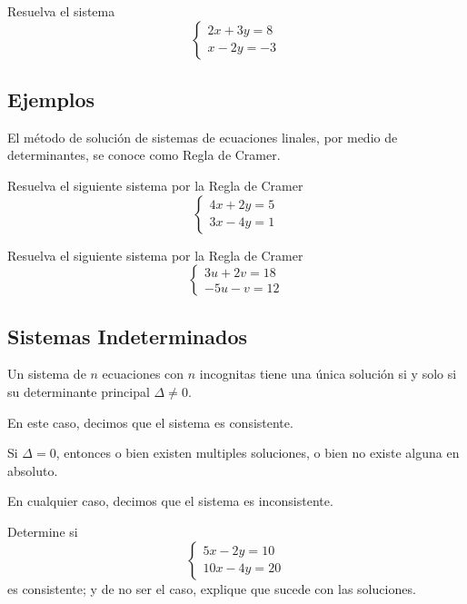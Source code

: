 	\begin{problema}
		Resuelva el sistema
		$$\begin{cases}
			2x+3y=8\\
			x-2y=-3
		\end{cases}
		$$
	\end{problema}
	

\subsection{Ejemplos}


	El m\'etodo de soluci\'on de sistemas de ecuaciones linales, por medio de determinantes, se conoce como Regla de Cramer.



	\begin{problema} Resuelva el siguiente sistema por la Regla de Cramer
		\label{spi:28.4a}
		$$
		\begin{cases}
			4x+2y=5\\
			3x-4y=1
		\end{cases}
		$$
	\end{problema}
	



	\begin{problema} Resuelva el siguiente sistema por la Regla de Cramer
		\label{spi:28.4b}
		$$
		\begin{cases}
			3u+2v=18\\
			-5u-v=12
		\end{cases}
		$$
	\end{problema}
	


\subsection{Sistemas Indeterminados}


	Un sistema de $ n $ ecuaciones con $ n $ incognitas tiene una única solución si y solo si su determinante principal $ \Delta \neq 0. $  
	
	En este caso, decimos que el sistema es consistente.



	Si $ \Delta =0 $, entonces o bien existen multiples soluciones, o bien no existe alguna en absoluto.
	
	En cualquier caso, decimos que el sistema es inconsistente.



	Determine si 
	$$\begin{cases}
		5x-2y=10\\
		10x-4y=20
	\end{cases}$$
	es consistente; y de no ser el caso, explique que sucede con las soluciones.



